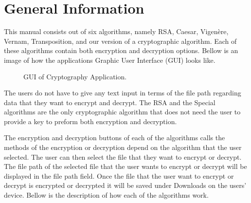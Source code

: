 \documentclass[a4paper,oneside,11pt]{book}
\begin{document}
\MakeTitle 
{} 
\tableofcontents
\pagestyle{plain}
\cleardoublepage 
{} 

\chapter[General Information]{General Information}

This manual consists out of six algorithms, namely RSA, Caesar, Vigenère, Vernam, Transposition, and our version of a cryptographic algorithm. Each of these algorithms contain both encryption and decryption options. Bellow is an image of how the applications Graphic User Interface (GUI) looks like.

\begin{figure}[h]
    \centering
    \caption{GUI of Cryptography Application.}
\end{figure}

The users do not have to give any text input in terms of the file path regarding data that they want to encrypt and decrypt. The RSA and the Special algorithms are the only cryptographic algorithm that does not need the user to provide a key to preform both encryption and decryption.

The encryption and decryption buttons of each of the algorithms calls the methods of the encryption or decryption depend on the algorithm that the user selected. The user can then select the file that they want to encrypt or decrypt. The file path of the selected file that the user wants to encrypt or decrypt will be displayed in the file path field. Once the file that the user want to encrypt or decrypt is encrypted or decrypted it will be saved under Downloads on the users' device. Bellow is the description of how each of the algorithms work.
\end{document}

